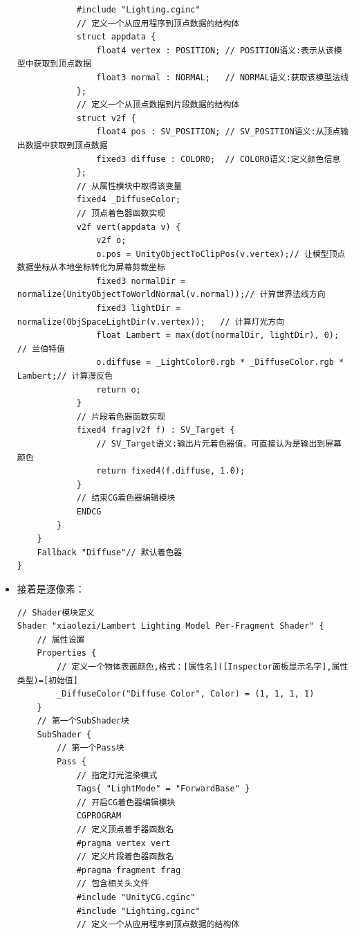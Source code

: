 \documentclass[9pt, b5paper]{article}
\begin{document}
\begin{itemize}
\begin{verbatim}
            #include "Lighting.cginc"  
            // 定义一个从应用程序到顶点数据的结构体  
            struct appdata {  
                float4 vertex : POSITION; // POSITION语义:表示从该模型中获取到顶点数据  
                float3 normal : NORMAL;   // NORMAL语义:获取该模型法线  
            };  
            // 定义一个从顶点数据到片段数据的结构体  
            struct v2f {  
                float4 pos : SV_POSITION; // SV_POSITION语义:从顶点输出数据中获取到顶点数据  
                fixed3 diffuse : COLOR0;  // COLOR0语义:定义颜色信息  
            };  
            // 从属性模块中取得该变量  
            fixed4 _DiffuseColor;  
            // 顶点着色器函数实现  
            v2f vert(appdata v) {  
                v2f o;  
                o.pos = UnityObjectToClipPos(v.vertex);// 让模型顶点数据坐标从本地坐标转化为屏幕剪裁坐标  
                fixed3 normalDir = normalize(UnityObjectToWorldNormal(v.normal));// 计算世界法线方向  
                fixed3 lightDir = normalize(ObjSpaceLightDir(v.vertex));   // 计算灯光方向  
                float Lambert = max(dot(normalDir, lightDir), 0);          // 兰伯特值  
                o.diffuse = _LightColor0.rgb * _DiffuseColor.rgb * Lambert;// 计算漫反色  
                return o;  
            }  
            // 片段着色器函数实现
            fixed4 frag(v2f f) : SV_Target { 
                // SV_Target语义:输出片元着色器值，可直接认为是输出到屏幕颜色             
                return fixed4(f.diffuse, 1.0);  
            }  
            // 结束CG着色器编辑模块  
            ENDCG  
        }  
    }  
    Fallback "Diffuse"// 默认着色器  
}
\end{verbatim}
\item 接着是逐像素：
\begin{verbatim}
// Shader模块定义  
Shader "xiaolezi/Lambert Lighting Model Per-Fragment Shader" {  
    // 属性设置  
    Properties {  
        // 定义一个物体表面颜色,格式：[属性名]([Inspector面板显示名字],属性类型)=[初始值]  
        _DiffuseColor("Diffuse Color", Color) = (1, 1, 1, 1)  
    }  
    // 第一个SubShader块  
    SubShader {  
        // 第一个Pass块  
        Pass {  
            // 指定灯光渲染模式  
            Tags{ "LightMode" = "ForwardBase" }  
            // 开启CG着色器编辑模块  
            CGPROGRAM  
            // 定义顶点着手器函数名  
            #pragma vertex vert  
            // 定义片段着色器函数名  
            #pragma fragment frag  
            // 包含相关头文件  
            #include "UnityCG.cginc"      
            #include "Lighting.cginc"  
            // 定义一个从应用程序到顶点数据的结构体  

\end{verbatim}
\end{itemize}
\end{document}
